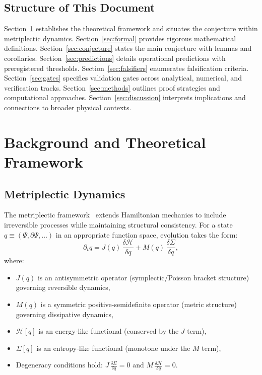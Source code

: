 \documentclass{article}
\begin{document}
\subsection*{Structure of This Document}

Section~\ref{sec:background} establishes the theoretical framework and situates the conjecture within metriplectic dynamics. Section~\ref{sec:formal} provides rigorous mathematical definitions. Section~\ref{sec:conjecture} states the main conjecture with lemmas and corollaries. Section~\ref{sec:predictions} details operational predictions with preregistered thresholds. Section~\ref{sec:falsifiers} enumerates falsification criteria. Section~\ref{sec:gates} specifies validation gates across analytical, numerical, and verification tracks. Section~\ref{sec:methods} outlines proof strategies and computational approaches. Section~\ref{sec:discussion} interprets implications and connections to broader physical contexts.

\section{Background and Theoretical Framework}
\label{sec:background}

\subsection*{Metriplectic Dynamics}

The metriplectic framework~\cite{morrison1984bracket,grmela1997dynamics} extends Hamiltonian mechanics to include irreversible processes while maintaining structural consistency. For a state $q \equiv (\Psi, \partial\Psi, \ldots)$ in an appropriate function space, evolution takes the form:
\begin{equation}
\partial_t q = J(q)\,\frac{\delta \mathcal{H}}{\delta q} + M(q)\,\frac{\delta \Sigma}{\delta q},
\label{eq:metriplectic}
\end{equation}
where:
\begin{itemize}[noitemsep]
\item $J(q)$ is an antisymmetric operator (symplectic/Poisson bracket structure) governing reversible dynamics,
\item $M(q)$ is a symmetric positive-semidefinite operator (metric structure) governing dissipative dynamics,
\item $\mathcal{H}[q]$ is an energy-like functional (conserved by the $J$ term),
\item $\Sigma[q]$ is an entropy-like functional (monotone under the $M$ term),
\item Degeneracy conditions hold: $J\,\frac{\delta\Sigma}{\delta q} = 0$ and $M\,\frac{\delta\mathcal{H}}{\delta q} = 0$.
\end{itemize}
\end{document}
